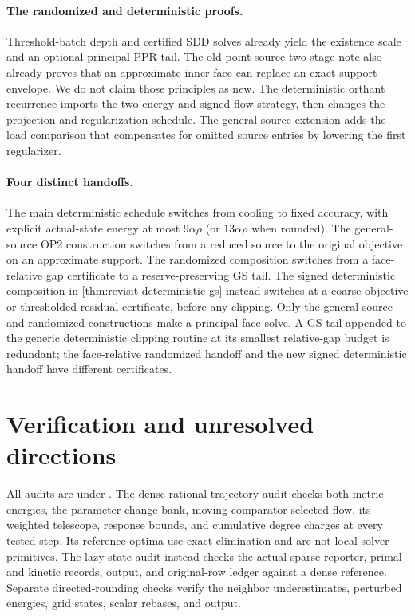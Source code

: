 \paragraph{The randomized and deterministic proofs.}
Threshold-batch depth and certified SDD solves already yield the existence
scale and an optional principal-PPR tail. The old point-source two-stage
note also already proves that an approximate inner face can replace an
exact support envelope. We do not claim those principles as new.
The deterministic orthant recurrence imports the two-energy and signed-flow
strategy, then changes the projection and regularization schedule.
The general-source extension adds the load comparison that compensates
for omitted source entries by lowering the first regularizer.

\paragraph{Four distinct handoffs.}
The main deterministic schedule switches from cooling to fixed accuracy,
with explicit actual-state energy at most $9\alpha\rho$ (or
$13\alpha\rho$ when rounded). The general-source OP2 construction switches
from a reduced source to the original objective on an approximate support.
The randomized composition switches from a face-relative gap certificate
to a reserve-preserving GS tail. The signed deterministic composition in
\cref{thm:revisit-deterministic-gs} instead switches at a coarse objective
or thresholded-residual certificate, before any clipping. Only the
general-source and randomized constructions make a principal-face solve.
A GS tail appended to the generic deterministic clipping routine at
its smallest relative-gap budget is redundant; the face-relative randomized
handoff and the new signed deterministic handoff have different certificates.

\section{Verification and unresolved directions}
All audits are under
.
The dense rational trajectory audit checks both metric energies, the
parameter-change bank, moving-comparator selected flow, its weighted
telescope, response bounds, and cumulative degree charges at every tested
step. Its reference optima use exact elimination and are not local solver
primitives. The lazy-state audit instead checks the actual sparse reporter,
primal and kinetic records, output, and original-row ledger against a dense
reference. Separate directed-rounding checks verify the neighbor
underestimates, perturbed energies, grid states, scalar rebases, and output.

